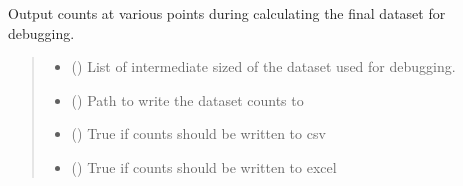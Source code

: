 \documentclass[letterpaper,10pt,english]{sphinxmanual}
\begin{document}
\begin{fulllineitems}
\label{\detokenize{write_subsets:write_subsets.output_debug_sizes}}
\pysigstartsignatures
{}
\pysigstopsignatures
\sphinxAtStartPar
Output counts at various points during calculating the final dataset for debugging.
\begin{quote}\begin{description}
\begin{itemize}
\item {} 
\sphinxAtStartPar
{} (\sphinxstyleliteralemphasis{\sphinxupquote{{[}}}\sphinxstyleliteralemphasis{\sphinxupquote{{[}}}\sphinxstyleliteralemphasis{\sphinxupquote{{]}}}\sphinxstyleliteralemphasis{\sphinxupquote{, }}\sphinxstyleliteralemphasis{\sphinxupquote{{[}}}\sphinxstyleliteralemphasis{\sphinxupquote{{]}}}\sphinxstyleliteralemphasis{\sphinxupquote{{]}}}) \textendash{} List of intermediate sized of the dataset used for debugging.

\item {} 
\sphinxAtStartPar
{} () \textendash{} Path to write the dataset counts to

\item {} 
\sphinxAtStartPar
{} () \textendash{} True if counts should be written to csv

\item {} 
\sphinxAtStartPar
{} () \textendash{} True if counts should be written to excel


\end{itemize}
\end{description}
\end{quote}
\end{fulllineitems}
\end{document}
